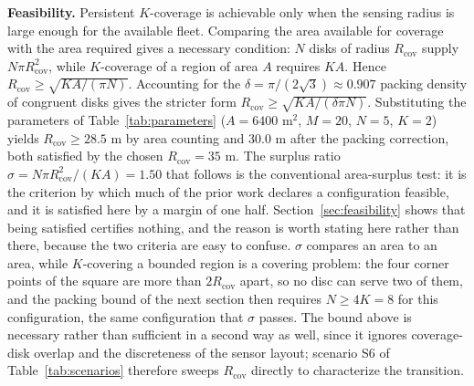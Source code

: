 \documentclass[conference]{IEEEtran}
\begin{document}
\medskip
\noindent\textbf{Feasibility.} Persistent $K$-coverage is achievable only when the sensing radius is large enough for the available fleet. Comparing the area available for coverage with the area required gives a necessary condition: $N$ disks of radius $R_{\mathrm{cov}}$ supply $N\pi R_{\mathrm{cov}}^{2}$, while $K$-coverage of a region of area $A$ requires $KA$. Hence $R_{\mathrm{cov}} \ge \sqrt{KA/(\pi N)}$. Accounting for the $\delta = \pi/(2\sqrt{3}) \approx 0.907$ packing density of congruent disks gives the stricter form $R_{\mathrm{cov}} \ge \sqrt{KA/(\delta\pi N)}$. Substituting the parameters of Table~\ref{tab:parameters} ($A = 6400$ m$^2$, $M = 20$, $N = 5$, $K = 2$) yields $R_{\mathrm{cov}} \ge 28.5$ m by area counting and $30.0$ m after the packing correction, both satisfied by the chosen $R_{\mathrm{cov}} = 35$ m. The surplus ratio $\sigma = N\pi R_{\mathrm{cov}}^{2}/(KA) = 1.50$ that follows is the conventional area-surplus test: it is the criterion by which much of the prior work declares a configuration feasible, and it is satisfied here by a margin of one half. Section~\ref{sec:feasibility} shows that being satisfied certifies nothing, and the reason is worth stating here rather than there, because the two criteria are easy to confuse. $\sigma$ compares an area to an area, while $K$-covering a bounded region is a covering problem: the four corner points of the square are more than $2R_{\mathrm{cov}}$ apart, so no disc can serve two of them, and the packing bound of the next section then requires $N \ge 4K = 8$ for this configuration, the same configuration that $\sigma$ passes. The bound above is necessary rather than sufficient in a second way as well, since it ignores coverage-disk overlap and the discreteness of the sensor layout; scenario S6 of Table~\ref{tab:scenarios} therefore sweeps $R_{\mathrm{cov}}$ directly to characterize the transition.
\end{document}
